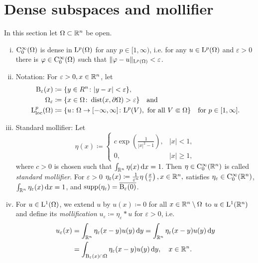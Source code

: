 \section{Dense subspaces and mollifier}
\label{sec:mollifier}

In this section let $\Omega \subset \mathbb{R}^n$ be open.
\begin{enumerate}[i)]
  \item $\mathrm{C}_0^\infty(\Omega)$ is dense in $\mathrm{L}^p(\Omega)$ for any $p \in [1,\infty)$, i.e. for any $u \in \mathrm{L}^p(\Omega)$ and $\varepsilon > 0$ there is $\varphi \in \mathrm{C}_0^\infty(\Omega)$ such that $\|\varphi - u\|_{\mathrm{L}^p(\Omega)} < \varepsilon$.
    \item Notation: For $\varepsilon > 0, x \in \mathbb{R}^n$, let 
      \begin{align*}
        \mathrm{B}_\varepsilon(x) &\coloneqq \{ y \in R^n \colon |y - x| < \varepsilon \}, \\
        \Omega_\varepsilon &\coloneqq \{ x \in \Omega \colon \operatorname{dist}(x, \partial\Omega) > \varepsilon \} \quad\text{and } \\
        \mathrm{L}_{\operatorname{loc}}^p(\Omega) &\coloneqq \{ u \colon \Omega \to [-\infty, \infty] \colon \mathrm{L}^p(V), \text{ for all } V \Subset \Omega \} \quad\text{for $p \in [1,\infty]$.}
    \end{align*}
  \item Standard mollifier: Let
    $$
    \eta(x) \coloneqq \begin{cases} c \exp\left( \frac{1}{|x|^2 - 1} \right), &|x| < 1, \\ 0, &|x| \geq 1, \end{cases}
    $$
    where $c > 0$ is chosen such that $\int_{\mathbb{R}^n} \eta(x) \, {\operatorname{d}\!{x}} = 1$.
    Then $\eta \in \mathrm{C}_0^\infty(\mathbb{R}^n)$ is called \emph{standard mollifier}.
    For $\varepsilon > 0$
    $
    \eta_\varepsilon(x) \coloneqq \frac{1}{\varepsilon^n} \eta \left(\frac{x}{\varepsilon} \right), x \in \mathbb{R}^n,
    $
    satisfies $\eta_\varepsilon \in \mathrm{C}_0^\infty(\mathbb{R}^n)$, $\int_{\mathbb{R}^n} \eta_\varepsilon(x) \, {\operatorname{d}\!{x}} = 1$, and $\operatorname{supp}(\eta_\varepsilon) = \overline{\mathrm{B}_\varepsilon(0)}$.
  \item For $u \in \mathrm{L}^1(\Omega)$, we extend $u$ by $u(x) \coloneqq 0$ for all $x \in \mathbb{R}^n \setminus \Omega$ to $u \in \mathrm{L}^1(\mathbb{R}^n)$ and define its \emph{mollification} $u_\varepsilon \coloneqq \eta_\varepsilon \ast u$ for $\varepsilon > 0$, i.e.
  \begin{align*}
    u_\varepsilon(x) 
    &= \int_{\mathbb{R}^n} \eta_\varepsilon(x - y) u(y) \, {\operatorname{d}\!{y}}
    = \int_{\mathbb{R}^n} \eta_\varepsilon(x - y) u(y) \, {\operatorname{d}\!{y}} \\
    &= \int_{\mathrm{B}_\varepsilon(x) \cap \Omega} \eta_\varepsilon(x - y) u(y) \, {\operatorname{d}\!{y}}, \quad x \in \mathbb{R}^n.
  \end{align*}
\end{enumerate}
